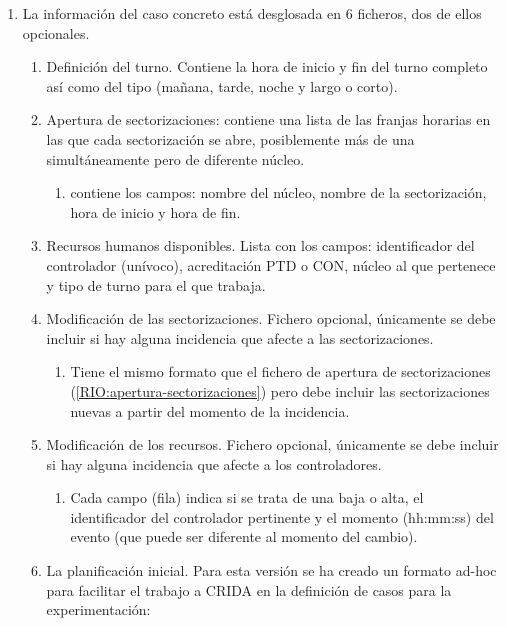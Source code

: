 \begin{enumerate}[label={\textbf{RIO\arabic*}}, ref={RIO\arabic*},  align=left]
	\item La información del caso concreto está desglosada en 6 ficheros, dos de ellos opcionales.
	\begin{enumerate}[label*={\textbf{.\arabic*}}]
		\item Definición del turno. Contiene la hora de inicio y fin del turno completo así como del tipo (mañana, tarde, noche y largo o corto).
		\item \label{RIO:apertura-sectorizaciones} Apertura de sectorizaciones: contiene una lista de las franjas horarias en las que cada sectorización se abre, posiblemente más de una simultáneamente pero de diferente núcleo.
		\begin{enumerate}[label*={\textbf{.\arabic*}}]
			\item contiene los campos: nombre del núcleo, nombre de la sectorización, hora de inicio y hora de fin.
		\end{enumerate}
		\item \label{RIO:rrhh-disponibles}  Recursos humanos disponibles. Lista con los campos: identificador del controlador (unívoco), acreditación PTD o CON, núcleo al que pertenece y tipo de turno para el que trabaja.
		\item Modificación de las sectorizaciones. Fichero opcional, únicamente se debe incluir si hay alguna incidencia que afecte a las sectorizaciones.
		\begin{enumerate}[label*={\textbf{.\arabic*}}]
			\item Tiene el mismo formato que el fichero de apertura de sectorizaciones (\ref{RIO:apertura-sectorizaciones}) pero debe incluir las sectorizaciones nuevas a partir del momento de la incidencia.
		\end{enumerate}
		\item Modificación de los recursos. Fichero opcional, únicamente se debe incluir si hay alguna incidencia que afecte a los controladores.
		\begin{enumerate}[label*={\textbf{.\arabic*}}]
			\item Cada campo (fila) indica si se trata de una baja o alta, el identificador del controlador pertinente y el momento (hh:mm:ss) del evento (que puede ser diferente al momento del cambio).
		\end{enumerate}
		\item La planificación inicial. Para esta versión se ha creado un formato ad-hoc para facilitar el trabajo a \gls{CRIDA} en la definición de casos para la experimentación:
		\begin{enumerate}[label*={\textbf{.\arabic*}}]

\end{enumerate}
\end{enumerate}
\end{enumerate}
